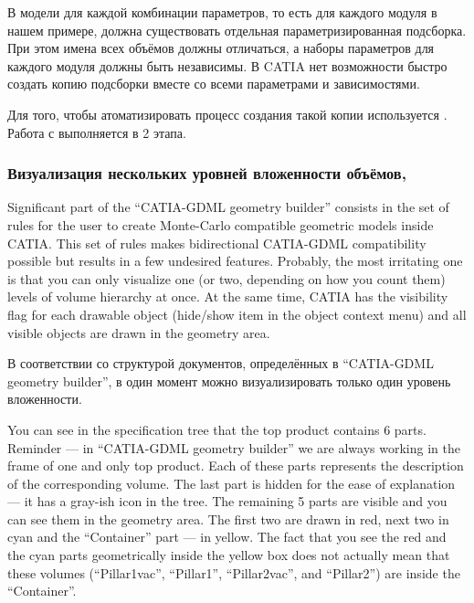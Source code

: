 В модели для каждой комбинации параметров, то есть для каждого модуля в нашем примере, должна существовать отдельная параметризированная подсборка. При этом имена всех объёмов должны отличаться, а наборы параметров для каждого модуля должны быть независимы. В CATIA нет возможности быстро создать копию подсборки вместе со всеми параметрами и зависимостями.

Для того, чтобы атоматизировать процесс создания такой копии используется .
Работа с  выполняется в 2 этапа.

\todo

\subsubsection{Визуализация нескольких уровней вложенности объёмов, }\label{sec:MultiLevelVis}


Significant part of the ``CATIA-GDML geometry builder'' consists in the set of rules for the user to create Monte-Carlo compatible geometric models inside CATIA.  This set of rules makes bidirectional CATIA-GDML compatibility possible but results in a few undesired features. Probably, the most irritating one is that you can only visualize one (or two, depending on how you count them) levels of volume hierarchy at once. At the same time, CATIA has the visibility flag for each drawable object (hide/show item in the object context menu) and all visible objects are drawn in the geometry area.

В соответствии со структурой документов, определённых в ``CATIA-GDML geometry builder'', в один момент можно визуализировать только один уровень вложенности.

You can see in the specification tree that the top product contains 6 parts. Reminder --- in ``CATIA-GDML geometry builder'' we are always working in the frame of one and only top product. Each of these parts represents the description of the corresponding volume. The last part is hidden for the ease of explanation --- it has a gray-ish icon in the tree. The remaining 5 parts are visible and you can see them in the geometry area. The first two are drawn in red, next two in cyan and the ``Container'' part --- in yellow. The fact that you see the red and the cyan parts geometrically inside the yellow box does not actually mean that these volumes (``Pillar1\textunderscore vac'', ``Pillar1'', ``Pillar2\textunderscore vac'', and ``Pillar2'') are inside the ``Container''.


